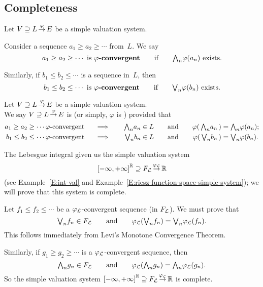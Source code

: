 \documentclass[main.tex]{subfiles}
\begin{document}
\subsection{Completeness}
%
%
\begin{dfn}
Let $V \supseteq L\,\smash{\stackrel{\varphi}{\rightarrow}}\,E$ be a simple valuation system.

Consider a sequence
$a_1 \geq a_2 \geq \dotsb$ from~$L$.
We say
\begin{equation*}
a_1 \geq a_2 \geq \dotsb \text{ is \textbf{$\varphi$-convergent}}
\qquad\text{if}\qquad \textstyle{\bigwedge}_n \varphi(a_n)\text{ exists.}
\end{equation*}

Similarly,
if
$b_1 \leq b_2 \leq \dotsb$ is
a sequence in~$L$, then 
\begin{equation*}
b_1 \leq b_2 \leq \dotsb \text{ is \textbf{$\varphi$-convergent}}
\qquad\text{if}\qquad \textstyle{\bigvee}_n \varphi(b_n)\text{ exists.}
\end{equation*}
\end{dfn}
%
%
\begin{dfn}
\label{D:system-complete}
Let $V \supseteq L\,\smash{\stackrel{\varphi}{\rightarrow}}\,E$ be a simple valuation system.\\
We say $V \supseteq L\,\smash{\stackrel{\varphi}{\rightarrow}}\,E$
is 
(or simply, $\varphi$ is )
 provided that
\begin{alignat*}{5}
a_1 \geq a_2 \geq \dotsb \text{$\varphi$-convergent }
  \quad &\implies \quad 
  & \textstyle{\bigwedge}_n a_n &\in L\quad 
  &&\text{and}\quad
  &\varphi(\,\textstyle{\bigwedge}_n a_n\,) &= \textstyle{\bigwedge}_n \varphi(a_n); \\
b_1 \leq b_2 \leq \dotsb \text{$\varphi$-convergent }
  \quad &\implies \quad 
  & \textstyle{\bigvee}_n b_n &\in L\quad 
  &&\text{and}\quad
  &\varphi(\,\textstyle{\bigvee}_n b_n\,) &= \textstyle{\bigvee}_n \varphi(b_n).
\end{alignat*}
\end{dfn}
%
%
\begin{ex}
\label{E:complete-lint}
The Lebesgue integral
given us the  simple valuation system
\begin{equation*}
{[-\infty,+\infty]}^{\mathbb{R}} \supseteq F_{\mathcal{L}}\,\smash{\stackrel{\varphi_{\mathcal{L}}}{\rightarrow}}\,\mathbb{R}
\end{equation*}
(see Example~\ref{E:int-val} and
Example~\ref{E:riesz-function-space-simple-system});
we will prove that this system is complete.

Let $f_1 \leq f_2 \leq \dotsb$
be a $\varphi_{\mathcal{L}}$-convergent sequence (in $F_{\mathcal{L}}$).
We must prove that 
\begin{equation*}
\textstyle{\bigvee}_n f_n \in F_{\mathcal{L}}
\qquad\text{and}\qquad\varphi_{\mathcal{L}}(\textstyle{\bigvee}_n f_n) = \textstyle{\bigvee}_n \varphi_{\mathcal{L}} (f_n).
\end{equation*}
This follows immediately from Levi's Monotone Convergence Theorem.

Similarly,
if $g_1 \geq g_2 \geq \dotsb$
is a $\varphi_{\mathcal{L}}$-convergent sequence,
then
\begin{equation*}
\textstyle{\bigwedge}_n g_n \in F_{\mathcal{L}}
\qquad\text{and}\qquad\varphi_{\mathcal{L}}(\textstyle{\bigwedge}_n g_n) = \textstyle{\bigwedge}_n \varphi_{\mathcal{L}} (g_n).
\end{equation*}
So the simple valuation system ${[-\infty,+\infty]}^{\mathbb{R}} \supseteq F_{\mathcal{L}}\,\smash{\stackrel{\varphi_{\mathcal{L}}}{\rightarrow}}\,\mathbb{R}$ is complete.
\end{ex}
\end{document}
